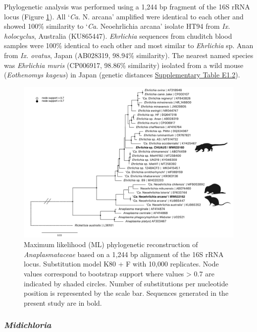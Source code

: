 \documentclass[a4paper, nobind]{templates/ociamthesis}
\begin{document}
Phylogenetic analysis was performed using a 1,244 bp fragment of the 16S rRNA locus (Figure \ref{fig:F3anaplas}).
All `\emph{Ca}. N. arcana' amplified were identical to each other and showed 100\% similarity to `\emph{Ca}. Neoehrlichia arcana' isolate HT94 from \emph{Ix. holocyclus}, Australia (KU865447).
\emph{Ehrlichia} sequences from chuditch blood samples were 100\% identical to each other and most similar to \emph{Ehrlichia} sp. Anan from \emph{Ix. ovatus}, Japan (AB028319, 98.94\% similarity).
The nearest named species was \emph{Ehrlichia muris} (CP006917, 98.86\% similarity) isolated from a wild mouse (\emph{Eothenomys kageus}) in Japan (genetic distances \protect\hyperlink{supplementary-table-e1.2}{Supplementary Table E1.2}).

\begin{figure}
\includegraphics[width=0.95\linewidth]{figures/ms-figs/Ch3-anaplasmataceaetree} \caption[Phylogeny of \textit{Anaplasmataceae} species.]{Maximum likelihood (ML) phylogenetic reconstruction of \textit{Anaplasmataceae} based on a 1,244 bp alignment of the 16S rRNA locus. Substitution model K80 + F with 10,000 replicates. Node values correspond to bootstrap support where values > 0.7 are indicated by shaded circles. Number of substitutions per nucleotide position is represented by the scale bar. Sequences generated in the present study are in bold.}\label{fig:F3anaplas}
\end{figure}

\hypertarget{midichloria}{%
\subsubsection{\texorpdfstring{\emph{Midichloria}}{Midichloria}}\label{midichloria}}
\end{document}
